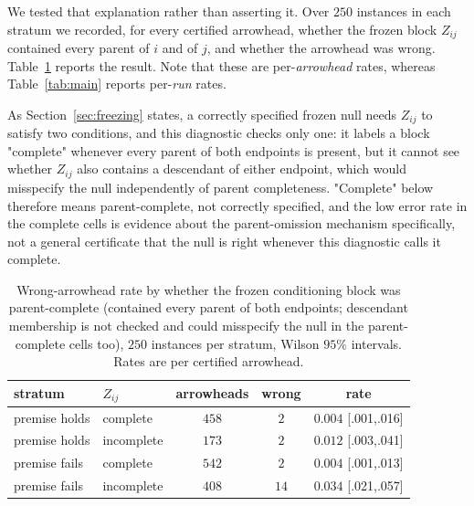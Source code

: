We tested that explanation rather than asserting it. Over $250$ instances in
each stratum we recorded, for every certified arrowhead, whether the frozen
block $Z_{ij}$ contained every parent of $i$ and of $j$, and whether the
arrowhead was wrong. Table~\ref{tab:diag} reports the result. Note that these
are per-\emph{arrowhead} rates, whereas Table~\ref{tab:main} reports
per-\emph{run} rates.

As Section~\ref{sec:freezing} states, a correctly specified frozen null needs
$Z_{ij}$ to satisfy two conditions, and this diagnostic checks only one: it
labels a block "complete" whenever every parent of both endpoints is present,
but it cannot see whether $Z_{ij}$ also contains a descendant of either
endpoint, which would misspecify the null independently of parent
completeness. "Complete" below therefore means parent-complete, not
correctly specified, and the low error rate in the complete cells is
evidence about the parent-omission mechanism specifically, not a general
certificate that the null is right whenever this diagnostic calls it
complete.

\begin{table}[t]
\centering
\caption{Wrong-arrowhead rate by whether the frozen conditioning block was
parent-complete (contained every parent of both endpoints; descendant
membership is not checked and could misspecify the null in the parent-complete
cells too), $250$ instances per stratum, Wilson $95\%$
intervals. Rates are per certified arrowhead.}\label{tab:diag}
\footnotesize
\begin{tabular}{@{}llccc@{}}
\toprule
stratum & $Z_{ij}$ & arrowheads & wrong & rate \\
\midrule
premise holds & complete   & $458$ & $2$  & $0.004$ \tiny{[.001,.016]} \\
premise holds & incomplete & $173$ & $2$  & $0.012$ \tiny{[.003,.041]} \\
premise fails & complete   & $542$ & $2$  & $0.004$ \tiny{[.001,.013]} \\
premise fails & incomplete & $408$ & $14$ & $0.034$ \tiny{[.021,.057]} \\
\bottomrule
\end{tabular}
\end{table}

